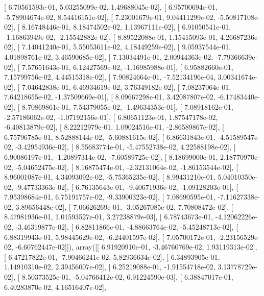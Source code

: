 \documentclass{article}
\begin{document}
       [  6.70561593e-01,   5.03255099e-02,   1.49688045e-02],
       [  6.95700694e-01,  -5.78904674e-02,   8.54416151e-02],
       [  7.23001679e-01,   9.04411299e-02,  -5.50817108e-02],
       [  8.16748446e-01,   8.18474502e-02,   1.13967111e-02],
       [  6.91050541e-01,  -1.16863949e-02,  -2.15542882e-02],
       [  8.89522088e-01,   1.15415093e-01,   4.26687236e-02],
       [  7.14041240e-01,   5.55053611e-02,   4.18449259e-02],
       [  9.05937544e-01,   4.01898761e-02,   3.46590685e-02],
       [  7.13034491e-01,   2.00944363e-02,  -7.79366639e-02],
       [  7.57651643e-01,   6.12427569e-02,  -1.16985988e-01],
       [  6.95882660e-01,   7.15799756e-02,   4.44515318e-02],
       [  7.90824664e-01,  -7.52134196e-04,   3.00341674e-02],
       [  7.04642838e-01,   6.46934619e-02,   3.76349182e-02],
       [  7.08237064e-01,   7.64218655e-02,  -1.37509669e-01],
       [  8.09667298e-01,   3.42087807e-02,  -6.17483440e-02],
       [  8.70869861e-01,   7.54379055e-02,  -1.49634353e-01],
       [  7.08918162e-01,  -2.57186062e-02,  -1.07192156e-01],
       [  6.80651123e-01,   1.87547178e-02,  -6.40813879e-02],
       [  8.22212979e-01,   1.09024516e-01,  -2.86589867e-02],
       [  6.75796785e-01,   8.52888144e-02,  -5.60881615e-02],
       [  6.86631843e-01,  -4.51589547e-02,  -3.42954936e-02],
       [  8.55683774e-01,  -5.47552738e-02,   4.22588198e-02],
       [  6.90086197e-01,  -1.20897314e-02,  -7.60589725e-02],
       [  8.18699000e-01,   2.18770970e-02,  -5.04652475e-02],
       [  8.16875474e-01,  -2.32131064e-02,  -1.86153544e-02],
       [  8.96001087e-01,   4.34093092e-02,  -5.75365235e-02],
       [  8.99431210e-01,   5.04010350e-02,  -9.47733363e-02],
       [  6.76135643e-01,  -9.40671936e-02,  -1.09128203e-01],
       [  7.95398684e-01,   6.75191757e-02,  -9.33900323e-02],
       [  7.08690595e-01,  -7.11627338e-02,   3.89656448e-02],
       [  7.06626269e-01,  -3.05267085e-02,   7.70808472e-02],
       [  8.47981936e-01,   1.01593527e-01,   3.27238879e-03],
       [  6.78743673e-01,  -4.12062226e-02,  -3.46319877e-02],
       [  6.82811866e-01,  -4.88663764e-02,  -5.45248713e-02],
       [  6.88319943e-01,   5.98445629e-02,  -6.24401597e-02],
       [  7.05700172e-01,  -2.23156529e-02,  -6.60762447e-02]]), array([[  6.91920910e-01,  -3.46760769e-02,   1.93119313e-02],
       [  6.47217822e-01,  -7.90466241e-02,   5.82936634e-02],
       [  6.34893905e-01,   1.14910310e-02,   2.39456007e-02],
       [  6.25219088e-01,  -1.91554718e-02,   3.13778729e-02],
       [  8.50373525e-01,  -5.04766412e-02,   6.91224590e-03],
       [  6.38847017e-01,   6.40283870e-02,   4.16516407e-02],
\end{document}
